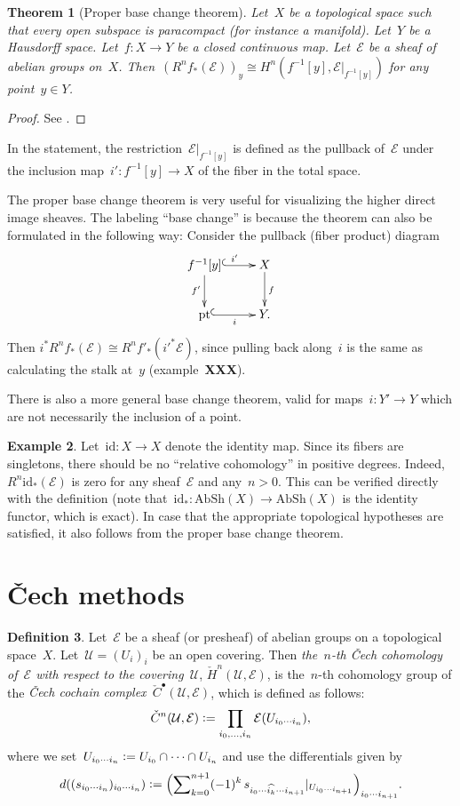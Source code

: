 \documentclass[10pt]{amsart}
\theoremstyle{definition}
\newtheorem{defn}{Definition}[section]
\newtheorem{ex}[defn]{Example}
\theoremstyle{plain}
\newtheorem{thm}[defn]{Theorem}
\theoremstyle{remark}
\newcommand{\E}{\mathcal{E}}
\newcommand{\U}{\mathcal{U}}
\newcommand{\AbSh}{\mathrm{AbSh}}
\newcommand{\defeq}{\vcentcolon=}
\newcommand{\pt}{\mathrm{pt}}
\newcommand{\id}{\mathrm{id}}
\begin{document}
\begin{thm}[Proper base change theorem]\label{thm:proper-base-change}
Let~$X$ be a topological space such
that every open subspace is paracompact (for instance a manifold). Let~$Y$ be
a Hausdorff space. Let~$f : X \to Y$ be a closed continuous map. Let~$\E$ be a
sheaf of abelian groups on~$X$. Then~$(R^n f_*(\E))_y \cong H^n(f^{-1}[y],
\E|_{f^{-1}[y]})$ for any point~$y \in Y$.\end{thm}

\begin{proof}See \cite[Thm.~8.11]{wedhorn}.\end{proof}

In the statement, the restriction~$\E|_{f^{-1}[y]}$ is defined as the pullback
of~$\E$ under the inclusion map~$i' : f^{-1}[y] \to X$ of the fiber in the
total space.

The proper base change theorem is very useful for visualizing the higher direct
image sheaves. The labeling ``base change'' is because the theorem can also be
formulated in the following way: Consider the pullback (fiber product) diagram
\[ \xymatrix{
  f^{-1}[y] \ar@{^{(}->}[r]^{i'} \ar[d]_{f'} & X \ar[d]^f \\
  \pt \ar@{^{(}->}[r]_i & Y.
} \]
Then $i^* R^n f_*(\E) \cong R^n f'_*(i'^*\E)$, since pulling back along~$i$ is
the same as calculating the stalk at~$y$ (example~\textbf{XXX}).

There is also a more general base change theorem, valid for maps~$i : Y' \to Y$
which are not necessarily the inclusion of a point.

\begin{ex}Let~$\id : X \to X$ denote the identity map. Since its fibers are
singletons, there should be no ``relative cohomology'' in positive degrees.
Indeed,~$R^n \id_*(\E)$ is zero for any sheaf~$\E$ and any~$n > 0$. This can be
verified directly with the definition (note that~$\id_* : \AbSh(X) \to
\AbSh(X)$ is the identity functor, which is exact). In case that the appropriate
topological hypotheses are satisfied, it also follows from the proper base
change theorem.\end{ex}


\section{Čech methods}

\begin{defn}Let~$\E$ be a sheaf (or presheaf) of abelian groups on a
topological space~$X$. Let~$\U = (U_i)_i$ be an open covering. Then
\emph{the~$n$-th Čech cohomology of~$\E$ with respect to the covering~$\U$},
$\check H^n(\U,\E)$, is the~$n$-th cohomology group of the \emph{Čech cochain
complex~$\check C^\bullet(\U,\E)$}, which is defined as follows:
\[ \check C^n(\U,\E) \defeq \prod_{i_0,\ldots,i_n} \E(U_{i_0 \cdots i_n}), \]
where we set~$U_{i_0 \cdots i_n} \defeq U_{i_0} \cap \cdots \cap U_{i_n}$ and
use the differentials given by
\[ d ((s_{i_0 \cdots i_n})_{i_0 \cdots i_n}) \defeq
  \Bigl(\sum\nolimits_{k=0}^{n+1} (-1)^k \, s_{i_0 \cdots \widehat{i_k} \cdots
  i_{n+1}}|_{U_{i_0 \cdots i_{n+1}}}\Bigr)_{i_0 \cdots i_{n+1}}. \]
\end{defn}
\end{document}
